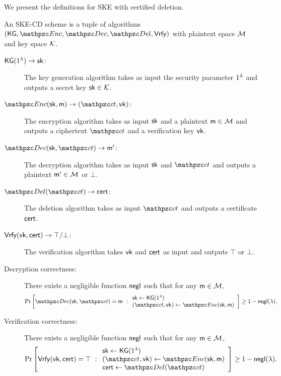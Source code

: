 We present the definitions for SKE with certified deletion.
\begin{definition}\label{def:SKE-CD}
An SKE-CD scheme is a tuple of algorithms $(\KG,\qEnc,\qDec,\qDel,\Vrfy)$ with plaintext space $\mathcal{M}$ and key space $\mathcal{K}$.
\begin{description}
    \item[$\mathsf{KG} (1^\lambda) \rightarrow \mathsf{sk}$:] The key generation algorithm takes as input the security parameter $1^\lambda$ and outputs a secret key $\mathsf{sk} \in \mathcal{K}$.
    \item[$\qEnc(\sk,\msg) \ra (\qct,\vk)$:] The encryption algorithm
    takes as input $\mathsf{sk}$ and a plaintext $\mathsf{m}\in\mathcal{M}$ and outputs a
    ciphertext $\qct$ and a verification key $\mathsf{vk}$.

    \item[$\qDec(\sk,\qct) \ra \msg^\prime$:] The decryption algorithm
        takes as input $\mathsf{sk}$ and $\qct$ and outputs a plaintext $\mathsf{m}^\prime \in \mathcal{M}$ or $\bot$.
    \item[$\qDel(\qct) \ra \cert$:] The deletion algorithm takes as
        input $\qct$ and outputs a certificate $\mathsf{cert}$.
    \item[$\mathsf{Vrfy}(\mathsf{vk},\mathsf{cert})\rightarrow \top/\bot$:] The verification
        algorithm takes $\mathsf{vk}$ and $\mathsf{cert}$ as input and outputs
        $\top$ or $\bot$.

\item[Decryption correctness:] There exists a negligible function
    ${\mathsf{negl}}$ such that for any $\mathsf{m}\in\mathcal{M}$, 
\begin{align}
\Pr\left[
\qDec(\sk,\qct)= \msg
\ :
\begin{array}{ll}
\sk\lrun \KG(1^\secp)\\
(\qct, \vk) \lrun \qEnc(\sk,\msg)
\end{array}
\right] 
\ge 1-\negl(\secp).
\end{align}

\item[Verification correctness:] There exists a negligible function
    ${\mathsf{negl}}$ such that for any $\mathsf{m}\in\mathcal{M}$, 
\begin{align}
\Pr\left[
\Vrfy(\vk,\cert)=\top
\ :
\begin{array}{ll}
\sk\lrun \KG(1^\secp)\\
(\qct, \vk) \lrun \qEnc(\sk,\msg)\\
\cert \lrun \qDel(\qct)
\end{array}
\right] 
\ge 1-\negl(\secp).
\end{align}
\end{description}
\end{definition}


